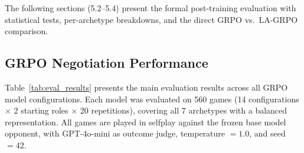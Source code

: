 \documentclass[12pt,a4paper]{article}
\renewcommand{\arraystretch}{1.25}
\begin{document}
The following sections (5.2--5.4) present the formal post-training evaluation with statistical tests, per-archetype breakdowns, and the direct GRPO vs.\ LA-GRPO comparison.


\subsection{GRPO Negotiation Performance}

Table~\ref{tab:eval_results} presents the main evaluation results across all GRPO model configurations. Each model was evaluated on 560 games (14 configurations $\times$ 2 starting roles $\times$ 20 repetitions), covering all 7 archetypes with a balanced representation. All games are played in selfplay against the frozen base model opponent, with GPT-4o-mini as outcome judge, temperature $= 1.0$, and seed $= 42$.

\begin{table}[H]
\centering
\caption[GRPO negotiation evaluation results.]{GRPO negotiation evaluation results (20 repetitions, 560 games per model). Bold indicates best per column. 95\% bootstrap confidence intervals in brackets.}
\label{tab:eval_results}
\renewcommand{\arraystretch}{1.15}
\end{table}
\end{document}
